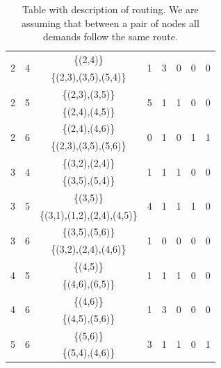 \begin{table}[h!]
\begin{tabular}{|| c | c | c | c | c | c | c | c ||}
 \multirow{2}{*}{2} & \multirow{2}{*}{4} & \{(2,4)\} & \multirow{2}{*}{1} & \multirow{2}{*}{3} & \multirow{2}{*}{0} & \multirow{2}{*}{0} & \multirow{2}{*}{0}\\
 & & \{(2,3),(3,5),(5,4)\} & & & & &\\ \hline
 \multirow{2}{*}{2} & \multirow{2}{*}{5} & \{(2,3),(3,5)\} & \multirow{2}{*}{5} & \multirow{2}{*}{1} & \multirow{2}{*}{1} & \multirow{2}{*}{0} & \multirow{2}{*}{0}\\
 & & \{(2,4),(4,5)\} & & & & &\\ \hline
 \multirow{2}{*}{2} & \multirow{2}{*}{6} & \{(2,4),(4,6)\} & \multirow{2}{*}{0} & \multirow{2}{*}{1} & \multirow{2}{*}{0} & \multirow{2}{*}{1} & \multirow{2}{*}{1}\\
 & & \{(2,3),(3,5),(5,6)\} & & & & &\\ \hline
 \multirow{2}{*}{3} & \multirow{2}{*}{4} & \{(3,2),(2,4)\} & \multirow{2}{*}{1} & \multirow{2}{*}{1} & \multirow{2}{*}{1} & \multirow{2}{*}{0} & \multirow{2}{*}{0}\\
 & & \{(3,5),(5,4)\} & & & & &\\ \hline
 \multirow{2}{*}{3} & \multirow{2}{*}{5} & \{(3,5)\} & \multirow{2}{*}{4} & \multirow{2}{*}{1} & \multirow{2}{*}{1} & \multirow{2}{*}{1} & \multirow{2}{*}{0}\\
 & & \{(3,1),(1,2),(2,4),(4,5)\} & & & & &\\ \hline
 \multirow{2}{*}{3} & \multirow{2}{*}{6} & \{(3,5),(5,6)\} & \multirow{2}{*}{1} & \multirow{2}{*}{0} & \multirow{2}{*}{0} & \multirow{2}{*}{0} & \multirow{2}{*}{0}\\
 & & \{(3,2),(2,4),(4,6)\} & & & & &\\ \hline
 \multirow{2}{*}{4} & \multirow{2}{*}{5} & \{(4,5)\} & \multirow{2}{*}{1} & \multirow{2}{*}{1} & \multirow{2}{*}{1} & \multirow{2}{*}{0} & \multirow{2}{*}{0}\\
 & & \{(4,6),(6,5)\} & & & & &\\ \hline
 \multirow{2}{*}{4} & \multirow{2}{*}{6} & \{(4,6)\} & \multirow{2}{*}{1} & \multirow{2}{*}{3} & \multirow{2}{*}{0} & \multirow{2}{*}{0} & \multirow{2}{*}{0}\\
 & & \{(4,5),(5,6)\} & & & & &\\ \hline
 \multirow{2}{*}{5} & \multirow{2}{*}{6} & \{(5,6)\} & \multirow{2}{*}{3} & \multirow{2}{*}{1} & \multirow{2}{*}{1} & \multirow{2}{*}{0} & \multirow{2}{*}{1}\\
 & & \{(5,4),(4,6)\} & & & & &\\
 \hline
\end{tabular}
\caption{Table with description of routing. We are assuming that between a pair of nodes all demands follow the same route.}
\label{path_opaque_protec_ref_low}
\end{table}


